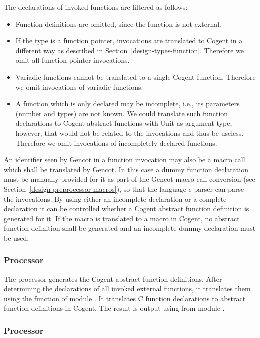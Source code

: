The declarations of invoked functions are filtered as follows:
\begin{itemize}
\item Function definitions are omitted, since the function is not external.
\item If the type is a function pointer, invocations are translated to Cogent in a different way as 
described in Section~\ref{design-types-function}. Therefore we omit all function pointer invocations.
\item Variadic functions cannot be translated to a single Cogent function. Therefore we omit invocations of
variadic functions.
\item A function which is only declared may be incomplete, i.e., its parameters (number and types) are not known. 
We could translate such function declarations to Cogent abstract functions with Unit as argument type, however,
that would not be related to the invocations and thus be useless. Therefore we omit invocations
of incompletely declared functions.
\end{itemize}

An identifier seen by Gencot in a function invocation may also be a macro call which shall be translated by Gencot. 
In this case a dummy function declaration must be manually provided for it as part of the Gencot macro call conversion
(see Section~\ref{design-preprocessor-macros}), so that the language-c parser can parse the invocations. By 
using either an incomplete declaration or a complete declaration it can be controlled whether a Cogent abstract 
function definition is generated for it. If the macro is translated to a macro in Cogent, no abstract function
definition shall be generated and an incomplete dummy declaration must be used.

\subsubsection{Processor }

The processor  generates the Cogent abstract function definitions. After determining the
declarations of all invoked external functions, it translates them using the function  of
module . It translates C function declarations to abstract function definitions
in Cogent. The result is output using  from module .

\subsubsection{Processor }

